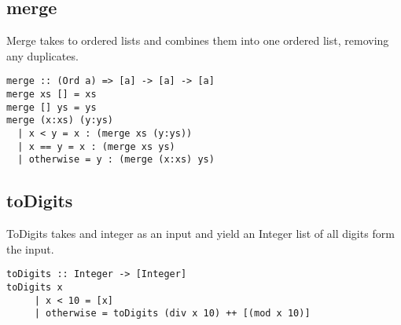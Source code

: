 \documentclass[a4paper,11pt]{article}
\begin{document}
\subsection{merge}

Merge takes to ordered lists and combines them into one ordered list, removing any duplicates.

\begin{lstlisting}
merge :: (Ord a) => [a] -> [a] -> [a]
merge xs [] = xs
merge [] ys = ys
merge (x:xs) (y:ys)
  | x < y = x : (merge xs (y:ys))
  | x == y = x : (merge xs ys)
  | otherwise = y : (merge (x:xs) ys)
\end{lstlisting}

\subsection{toDigits}

ToDigits takes and integer as an input and yield an Integer list of all digits form the input.

\begin{lstlisting}
toDigits :: Integer -> [Integer]
toDigits x
	 | x < 10 = [x]
	 | otherwise = toDigits (div x 10) ++ [(mod x 10)]
\end{lstlisting}
\end{document}

